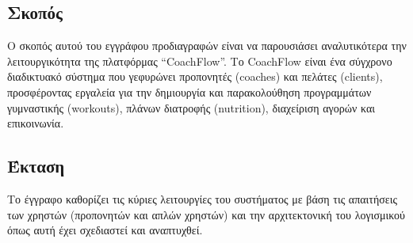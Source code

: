 \documentclass[12pt,a4paper]{report}
\begin{document}
\subsection{Σκοπός}
Ο σκοπός αυτού του εγγράφου προδιαγραφών είναι να παρουσιάσει αναλυτικότερα την λειτουργικότητα της πλατφόρμας “CoachFlow”. Το CoachFlow είναι ένα σύγχρονο διαδικτυακό σύστημα που γεφυρώνει προπονητές (coaches) και πελάτες (clients), προσφέροντας εργαλεία για την δημιουργία και παρακολούθηση προγραμμάτων γυμναστικής (workouts), πλάνων διατροφής (nutrition), διαχείριση αγορών και επικοινωνία.

\subsection{Έκταση}
Το έγγραφο καθορίζει τις κύριες λειτουργίες του συστήματος με βάση τις απαιτήσεις των χρηστών (προπονητών και απλών χρηστών) και την αρχιτεκτονική του λογισμικού όπως αυτή έχει σχεδιαστεί και αναπτυχθεί.
\end{document}
